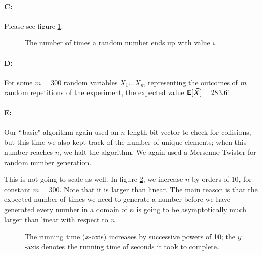 \documentclass[11pt]{article}
\newcommand{\E}{\textbf{\textsf{E}}}
\begin{document}
\paragraph*{C:} Please see figure \ref{fig:cdp2}.

\begin{figure}[h]
\caption{The number of times a random number ends up with value $i$.}
\label{fig:cdp2}
\end{figure}

\paragraph*{D:} For some $m = 300$ random variables $X_1 \ldots X_m$ representing the outcomes of $m$ random repetitions of the experiment, the expected value $\E[\vec{X}] = 283.61$

\paragraph*{E:} Our ``basic" algorithm again used an $n$-length bit vector to check for collisions, but this time we also kept track of the number of unique elements; when this number reaches $n$, we halt the algorithm. We again used a Mersenne Twister for random number generation.

This is not going to scale as well. In figure \ref{fig:runningtimes2}, we increase $n$ by orders of 10, for constant $m = 300$. Note that it is larger than linear. The main reason is that the expected number of times we need to generate a number before we have generated every number in a domain of $n$ is going to be asymptotically much larger than linear with respect to $n$.

\begin{figure}[h]
\caption{The running time ($x$-axis) increases by successive powers of 10; the $y$-axis denotes the running time of seconds it took to complete.}
\label{fig:runningtimes2}
\end{figure}
\end{document}
